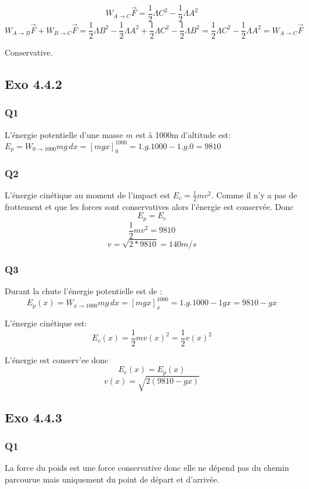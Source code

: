 \documentclass[]{book}
\theoremstyle{definition}
\begin{document}
$$W_{A \to C}\overrightarrow{F} = \frac{1}{2}\Lambda C^2 - \frac{1}{2}\Lambda A^2$$
$$W_{A \to B}\overrightarrow{F} + W_{B \to C}\overrightarrow{F} = \frac{1}{2}\Lambda B^2 - \frac{1}{2}\Lambda A^2 + \frac{1}{2}\Lambda C^2 - \frac{1}{2}\Lambda B^2 = \frac{1}{2}\Lambda C^2 - \frac{1}{2}\Lambda A^2 = W_{A \to C}\overrightarrow{F}$$

Conservative.

\subsection*{Exo 4.4.2}
\subsubsection{Q1}
L'\'energie potentielle d'une masse $m$ est \`a 1000m d'altitude est:
$E_p = W_{0 \to 1000} mg\, dx = [mgx]_0^{1000} = 1.g.1000 - 1.g.0 = 9810$

\subsubsection{Q2}
L'\'energie cin\'etique au moment de l'impact est $E_c = \frac{1}{2}mv^2$. Comme il n'y a pas de frottement et que les forces sont conservatives alors l'\'energie est conserv\'ee. Donc 
$$E_p = E_c$$
$$\frac{1}{2}mv^2 = 9810$$
$$v = \sqrt{2*9810} = 140 m/s$$

\subsubsection{Q3}
Durant la chute l'\'energie potentielle est de :
$$E_p(x) = W_{x \to 1000} mg\, dx = [mgx]_x^{1000} = 1.g.1000 - 1gx = 9810 - gx$$

L'\'energie cin\'etique est:
$$E_c(x) = \frac{1}{2}mv(x)^2 = \frac{1}{2}v(x)^2$$

L'\'energie est conserv'ee donc
$$E_c(x) = E_p(x)$$
$$v(x) = \sqrt{2(9810 - gx)}$$


\subsection*{Exo 4.4.3}
\subsubsection{Q1}
La force du poids est une force conservative donc elle ne d\'epend pas du chemin parcourue mais uniquement du point de d\'epart et d'arriv\'ee. 
\end{document}
